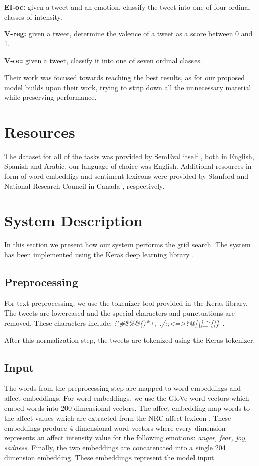 \documentclass[10pt, a4paper]{article}
\begin{document}
\textbf{EI-oc:} given a tweet and an emotion, classify the tweet into one of four ordinal classes of intensity.

\textbf{V-reg:} given a tweet, determine the valence of a tweet as a score between 0 and 1.

\textbf{V-oc:} given a tweet, classify it into one of seven ordinal classes.


Their work was focused towards reaching the best results, as for our proposed model builds upon their work, trying to strip down all the unnecessary material while preserving performance.

\section{Resources}
The dataset for all of the tasks was provided by SemEval itself \citep{mohammed-semeval}, both in English, Spanish and Arabic, our language of choice was English. Additional resources in form of word embeddigs and sentiment lexicons were provided by Stanford \citep{glove} and National Research Council in Canada \citep{nrcic}, respectively. 


\section{System Description}
In this section we present how our system performs the grid search.
The system has been implemented using the Keras deep learning library \citep{chollet2015keras}.

\subsection{Preprocessing}
For text preprocessing, we use the tokenizer tool provided in the Keras library.
The tweets are lowercased and the special characters and
punctuations are removed.
These characters include: \textit{!"#\$\%&()*+,-./:;<=>?@[\textbackslash]\^\_`\{|\}~}.

After this normalization step, the tweets are tokenized using the Keras tokenizer.

\subsection{Input}
The words from the preprocessing step are mapped to word embeddings
and affect embeddings.
For word embeddings, we use the GloVe word vectors \citep{glove} 
which embed words into 200 dimensional vectors.
The affect embedding map words to the affect values which are
extracted from the NRC affect lexicon \citep{mohammed-semeval}.
These embeddings produce 4 dimensional word vectors where every
dimension represents an affect intensity value for the following emotions: \textit{anger, fear, joy, sadness}.
Finally, the two embeddings are concatenated into a single 204 dimension embedding.
These embeddings represent the model input.
\end{document}
